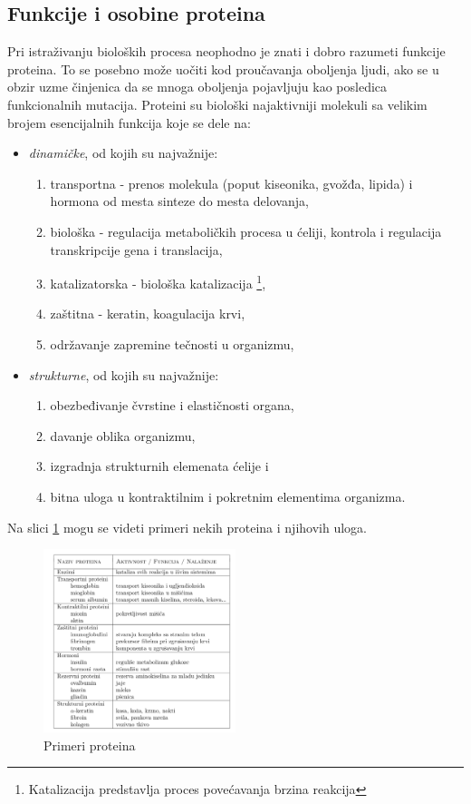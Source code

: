 \subsection{Funkcije i osobine proteina}
Pri istraživanju bioloških procesa neophodno je znati i dobro razumeti funkcije proteina. To se posebno može uočiti kod proučavanja oboljenja ljudi, ako se u obzir uzme činjenica da se mnoga oboljenja pojavljuju kao posledica funkcionalnih mutacija. Proteini su biološki najaktivniji molekuli sa velikim brojem esencijalnih funkcija koje se dele na:
\begin{itemize}
\item \textit{dinamičke}, od kojih su najvažnije:
\begin{enumerate} 
\item transportna - prenos molekula (poput kiseonika, gvožđa, lipida) i hormona od mesta sinteze do mesta delovanja,
\item biološka - regulacija metaboličkih procesa u ćeliji, kontrola i regulacija transkripcije gena i translacija,
\item katalizatorska - biološka katalizacija \footnote{Katalizacija predstavlja proces povećavanja brzina reakcija},
\item zaštitna - keratin, koagulacija krvi,
\item održavanje zapremine tečnosti u organizmu,
\end{enumerate}
\item \textit{strukturne}, od kojih su najvažnije:
\begin{enumerate}
\item obezbeđivanje čvrstine i elastičnosti organa,
\item davanje oblika organizmu,
\item izgradnja strukturnih elemenata ćelije i
\item bitna uloga u kontraktilnim i pokretnim elementima organizma.
\end{enumerate}
\end{itemize} 
Na slici \ref{fig:primeriproteina} mogu se videti primeri nekih proteina i njihovih uloga.
\begin{figure}[h]
	\centering
    \includegraphics[width=0.5\textwidth]{Figures/BO/primeriproteina.png}
    \caption{Primeri proteina~\cite{Principi}}
    \label{fig:primeriproteina}
\end{figure}	

